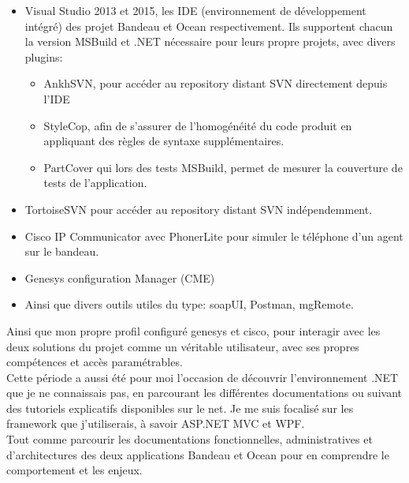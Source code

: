 \documentclass{rapport}
\begin{document}
\begin{itemize}
  \item Visual Studio 2013 et 2015, les IDE (environnement de développement intégré) des projet Bandeau et Ocean respectivement. Ils supportent chacun la version MSBuild et .NET nécessaire pour leurs propre projets, avec divers plugins:
  
    \begin{itemize}
        \item AnkhSVN, pour accéder au repository distant SVN directement depuis l'IDE
  
        \item StyleCop, afin de s'assurer de l'homogénéité du code produit en appliquant des règles de syntaxe supplémentaires.
  
        \item PartCover qui lors des tests MSBuild, permet de mesurer la couverture de tests de l'application.
    \end{itemize}

  \item TortoiseSVN pour accéder au repository distant SVN indépendemment.
  
  \item Cisco IP Communicator avec PhonerLite pour simuler le téléphone d'un agent sur le bandeau.
  
  \item Genesys configuration Manager (CME)
  
  \item Ainsi que divers outils utiles du type: soapUI, Postman, mgRemote.
  
\end{itemize}

Ainsi que mon propre profil configuré genesys et cisco, pour interagir avec les deux solutions du projet comme un véritable utilisateur, avec ses propres compétences et accès paramétrables.\\

Cette période a aussi été pour moi l'occasion de découvrir l'environnement .NET que je ne connaissais pas, en parcourant les différentes documentations ou suivant des tutoriels explicatifs disponibles sur le net. Je me suis focalisé sur les framework que j'utiliserais, à savoir ASP.NET MVC et WPF.\\
Tout comme parcourir les documentations fonctionnelles, administratives et d'architectures des deux applications Bandeau et Ocean pour en comprendre le comportement et les enjeux.\\
\end{document}

